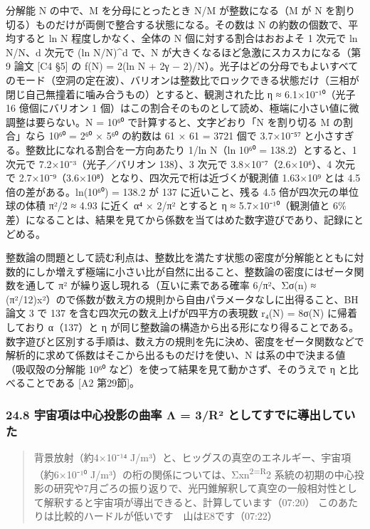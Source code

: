 \documentclass[
  a4paper,
]{ltjsarticle}
\begin{document}
分解能 N の中で、M を分母にとったとき N/M が整数になる（M が N
を割り切る）ものだけが両側で整合する状態になる。その数は N
の約数の個数で、平均すると ln N 程度しかなく、全体の N
個に対する割合はおおよそ 1 次元で ln N/N、d 次元で (ln N/N)\^{}d で、N
が大きくなるほど急激にスカスカになる（第 9 論文 {[}C4 §5{]} の f(N) =
2(ln N + 2γ −
2)/N）。光子はどの分母でもよいすべてのモード（空洞の定在波）、バリオンは整数比でロックできる状態だけ（三相が閉じ自己無撞着に噛み合うもの）とすると、観測された比
η ≈ 6.1×10⁻¹⁰（光子 16 億個にバリオン 1
個）はこの割合そのものとして読め、極端に小さい値に微調整は要らない。N =
10⁶⁰ で計算すると、文字どおり「N を割り切る M の割合」なら 10⁶⁰ = 2⁶⁰ ×
5⁶⁰ の約数は 61 × 61 = 3721 個で 3.7×10⁻⁵⁷
と小さすぎる。整数比になれる割合を一方向あたり 1/ln N（ln 10⁶⁰ =
138.2）とすると、1 次元で 7.2×10⁻³（光子／バリオン 138）、3 次元で
3.8×10⁻⁷（2.6×10⁶）、4 次元で
2.7×10⁻⁹（3.6×10⁸）となり、四次元で桁は近づくが観測値 1.63×10⁹ とは 4.5
倍の差がある。ln(10⁶⁰) = 138.2 が 137 に近いこと、残る 4.5
倍が四次元の単位球の体積 π²/2 ≈ 4.93 に近く α⁴ × 2/π² とすると η ≈
5.7×10⁻¹⁰（観測値と 6\%
差）になることは、結果を見てから係数を当てはめた数字遊びであり、記録にとどめる。

整数論の問題として読む利点は、整数比を満たす状態の密度が分解能とともに対数的にしか増えず極端に小さい比が自然に出ること、整数論の密度にはゼータ関数を通して
π² が繰り返し現れる（互いに素である確率 6/π²、Σσ(n) ≈
(π²/12)x²）ので係数が数え方の規則から自由パラメータなしに出得ること、BH
論文 3 で 137 を含む四次元の数え上げが四平方の表現数 r₄(N) = 8σ(N)
に帰着しており α（137）と η
が同じ整数論の構造から出る形になり得ることである。数字遊びと区別する手順は、数え方の規則を先に決め、密度をゼータ関数などで解析的に求めて係数はそこから出るものだけを使い、N
は系の中で決まる値（吸収殻の分解能 10⁶⁰
など）を使って結果を見て動かさず、そのうえで η と比べることである {[}A2
第29節{]}。

\subsubsection{24.8 宇宙項は中心投影の曲率 Λ = 3/R²
としてすでに導出していた}\label{ux5b87ux5b99ux9805ux306fux4e2dux5fc3ux6295ux5f71ux306eux66f2ux7387-ux3bb-3ruxb2-ux3068ux3057ux3066ux3059ux3067ux306bux5c0eux51faux3057ux3066ux3044ux305f}

\begin{quote}
背景放射（約4×10⁻¹⁴
J/m³）と、ヒッグスの真空のエネルギー、宇宙項（約6×10⁻¹⁰
J/m³）の桁の関係については、Σxn\textsuperscript{2=R}2
系統の初期の中心投影の研究や7月ごろの振り返りで、光円錐解釈して真空の一般相対性として解釈すると宇宙項が導出できると、計算しています（07:20）
このあたりは比較的ハードルが低いです　山はE8です（07:22）
\end{quote}
\end{document}
